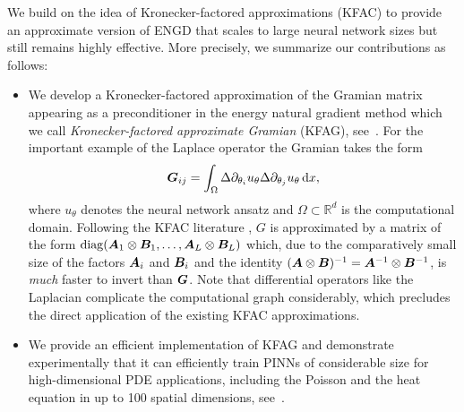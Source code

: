 We build on the idea of Kronecker-factored approximations (KFAC) to provide an approximate version of ENGD that scales to large neural network sizes but still remains highly effective. 
More precisely, we summarize our contributions as follows: 
\begin{itemize}
    \item We develop a Kronecker-factored approximation of the Gramian matrix appearing as a preconditioner in the energy natural gradient method which we call \emph{Kronecker-factored approximate Gramian} (KFAG), see~. For the important example of the Laplace operator the Gramian takes the form
    \begin{equation*}
        {\bm{G}}_{ij}
        =
        \int_\Omega \Delta \partial_{\theta_i} u_\theta \Delta \partial_{\theta_j} u_\theta \, \mathrm dx, 
    \end{equation*}
    where $u_\theta$ denotes the neural network ansatz and $\Omega\subset\mathbb R^d$ is the computational domain. Following the KFAC literature \cite{martens2015optimizing}, $G$ is approximated by a matrix of the form $\operatorname{diag}({\bm{A}}_1\otimes{\bm{B}}_1, \dots, {\bm{A}}_L\otimes{\bm{B}}_L)$ which, due to the comparatively small size of the factors ${\bm{A}}_i$ and ${\bm{B}}_i$ and the identity $({\bm{A}} \otimes {\bm{B}})^{-1} = {\bm{A}}^{-1} \otimes {\bm{B}}^{-1}$, is \emph{much} faster to invert than ${\bm{G}}$. Note that differential operators like the Laplacian complicate the computational graph considerably, which precludes the direct application of the existing KFAC approximations.
    \item We provide an efficient implementation of KFAG and demonstrate experimentally that it can efficiently train PINNs of considerable size for high-dimensional PDE applications, including the Poisson and the heat equation in up to 100 spatial dimensions, see~.  
\end{itemize}

